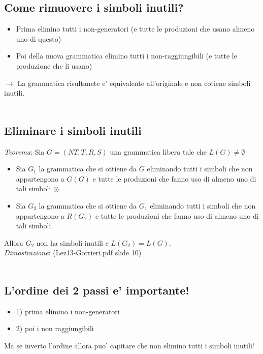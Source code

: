 \documentclass[a4paper,12pt]{article}
\begin{document}
{\subsection{Come rimuovere i simboli inutili?}
\begin{itemize}
  \item Prima elimino tutti i non-generatori (e tutte le produzioni che usano almeno uno di questo)
  \item Poi della nuova grammatica elimino tutti i non-raggiungibili (e tutte le produzione che li usano)
\end{itemize}
$\to$ La grammatica risultanete e' equivalente all'originale e non cotiene simboli inutili. \\
\vspace{1em} \\
\subsection{Eliminare i simboli inutili}
\textit{Teorema}: Sia $G = (NT, T, R, S)$ una grammatica libera tale che $L(G) \neq \emptyset$
\begin{itemize}
  \item Sia $G_1$ la grammatica che si ottiene da $G$ eliminando tutti i simboli che non appartengono a $G(G)$ e tutte le produzioni che fanno uso di almeno uno di tali simboli $\circledast$.
  \item Sia $G_2$ la grammatica che si ottiene da $G_1$ eliminando tutti i simboli che non appartengono a $R(G_1)$ e tutte le produzioni che fanno uso di almeno uno di tali simboli.
\end{itemize}
Allora $G_2$ non ha simboli inutili e $L(G_2) = L(G)$. \\
\textit{Dimostrazione}: (Lez13-Gorrieri.pdf slide 10) \\
\vspace{1em} \\
\subsection*{L'ordine dei 2 passi e' importante!}
\begin{itemize}
  \item 1) prima elimino i non-generatori
  \item 2) poi i non raggiungibili
\end{itemize}
Ma se inverto l'ordine allora puo' capitare che non elimino tutti i simboli inutili! 
}
\end{document}
